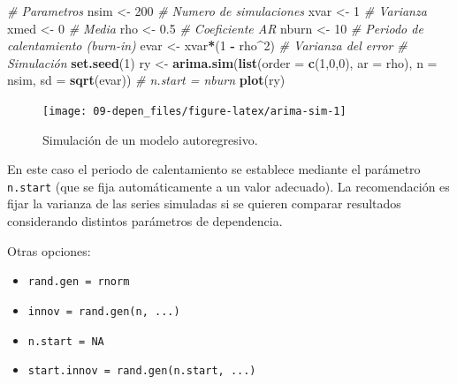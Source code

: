 \documentclass[]{book}
\newenvironment{Shaded}{\begin{snugshade}}{\end{snugshade}}
\newcommand{\KeywordTok}[1]{\textcolor[rgb]{0.13,0.29,0.53}{\textbf{#1}}}
\newcommand{\DataTypeTok}[1]{\textcolor[rgb]{0.13,0.29,0.53}{#1}}
\newcommand{\DecValTok}[1]{\textcolor[rgb]{0.00,0.00,0.81}{#1}}
\newcommand{\FloatTok}[1]{\textcolor[rgb]{0.00,0.00,0.81}{#1}}
\newcommand{\StringTok}[1]{\textcolor[rgb]{0.31,0.60,0.02}{#1}}
\newcommand{\CommentTok}[1]{\textcolor[rgb]{0.56,0.35,0.01}{\textit{#1}}}
\newcommand{\OperatorTok}[1]{\textcolor[rgb]{0.81,0.36,0.00}{\textbf{#1}}}
\newcommand{\NormalTok}[1]{#1}
\theoremstyle{definition}
\theoremstyle{definition}
\theoremstyle{definition}
\theoremstyle{remark}
\begin{document}
\begin{Shaded}
\begin{Highlighting}[]
\CommentTok{# Parametros}
\NormalTok{nsim <-}\StringTok{ }\DecValTok{200}   \CommentTok{# Numero de simulaciones}
\NormalTok{xvar <-}\StringTok{ }\DecValTok{1}     \CommentTok{# Varianza}
\NormalTok{xmed <-}\StringTok{ }\DecValTok{0}     \CommentTok{# Media}
\NormalTok{rho <-}\StringTok{ }\FloatTok{0.5}    \CommentTok{# Coeficiente AR}
\NormalTok{nburn <-}\StringTok{ }\DecValTok{10}   \CommentTok{# Periodo de calentamiento (burn-in)}
\NormalTok{evar <-}\StringTok{ }\NormalTok{xvar}\OperatorTok{*}\NormalTok{(}\DecValTok{1} \OperatorTok{-}\StringTok{ }\NormalTok{rho}\OperatorTok{^}\DecValTok{2}\NormalTok{) }\CommentTok{# Varianza del error}
\CommentTok{# Simulación}
\KeywordTok{set.seed}\NormalTok{(}\DecValTok{1}\NormalTok{)}
\NormalTok{ry <-}\StringTok{ }\KeywordTok{arima.sim}\NormalTok{(}\KeywordTok{list}\NormalTok{(}\DataTypeTok{order =} \KeywordTok{c}\NormalTok{(}\DecValTok{1}\NormalTok{,}\DecValTok{0}\NormalTok{,}\DecValTok{0}\NormalTok{), }\DataTypeTok{ar =}\NormalTok{ rho), }
            \DataTypeTok{n =}\NormalTok{ nsim, }\DataTypeTok{sd =} \KeywordTok{sqrt}\NormalTok{(evar)) }\CommentTok{# n.start = nburn}
\KeywordTok{plot}\NormalTok{(ry)}
\end{Highlighting}
\end{Shaded}

\begin{figure}[!htb]

{\centering \texttt{[image: 09-depen\_files/figure-latex/arima-sim-1]} 

}

\caption{Simulación de un modelo autoregresivo.}\label{fig:arima-sim}
\end{figure}

En este caso el periodo de calentamiento se establece mediante el
parámetro \texttt{n.start} (que se fija automáticamente a un valor
adecuado). La recomendación es fijar la varianza de las series simuladas
si se quieren comparar resultados considerando distintos parámetros de
dependencia.

Otras opciones:

\begin{itemize}
\item
  \texttt{rand.gen\ =\ rnorm}
\item
  \texttt{innov\ =\ rand.gen(n,\ ...)}
\item
  \texttt{n.start\ =\ NA}
\item
  \texttt{start.innov\ =\ rand.gen(n.start,\ ...)}
\end{itemize}
\end{document}
